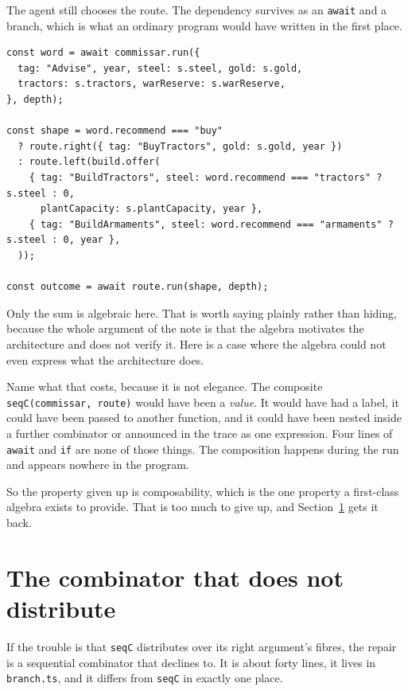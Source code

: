 \documentclass[11pt,a4paper]{article}
\begin{document}
The agent still chooses the route. The dependency survives as an \texttt{await} and a branch,
which is what an ordinary program would have written in the first place.

\begin{lstlisting}[language=TS]
const word = await commissar.run({
  tag: "Advise", year, steel: s.steel, gold: s.gold,
  tractors: s.tractors, warReserve: s.warReserve,
}, depth);

const shape = word.recommend === "buy"
  ? route.right({ tag: "BuyTractors", gold: s.gold, year })
  : route.left(build.offer(
    { tag: "BuildTractors", steel: word.recommend === "tractors" ? s.steel : 0,
      plantCapacity: s.plantCapacity, year },
    { tag: "BuildArmaments", steel: word.recommend === "armaments" ? s.steel : 0, year },
  ));

const outcome = await route.run(shape, depth);
\end{lstlisting}

Only the sum is algebraic here. That is worth saying plainly rather than hiding, because the
whole argument of the note is that the algebra motivates the architecture and does not verify
it. Here is a case where the algebra could not even express what the architecture does.

Name what that costs, because it is not elegance. The composite \texttt{seqC(commissar, route)}
would have been a \emph{value}. It would have had a label, it could have been passed to another
function, and it could have been nested inside a further combinator or announced in the trace
as one expression. Four lines of \texttt{await} and \texttt{if} are none of those things. The
composition happens during the run and appears nowhere in the program.

So the property given up is composability, which is the one property a first-class algebra
exists to provide. That is too much to give up, and Section~\ref{sec:fix} gets it back.

\section{The combinator that does not distribute}
\label{sec:fix}

If the trouble is that \texttt{seqC} distributes over its right argument's fibres, the repair is
a sequential combinator that declines to. It is about forty lines, it lives in
\texttt{branch.ts}, and it differs from \texttt{seqC} in exactly one place.
\end{document}
